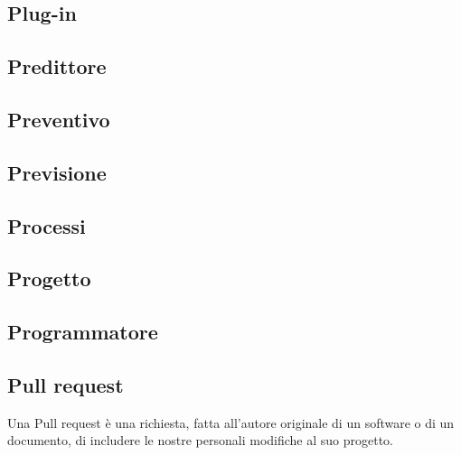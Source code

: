 
\subsection*{Plug-in}

\subsection*{Predittore}

\subsection*{Preventivo}

\subsection*{Previsione}

\subsection*{Processi}

\subsection*{Progetto}

\subsection*{Programmatore}

\subsection*{Pull request}
Una Pull request è una richiesta, fatta all’autore originale di un software o di un documento, di includere le nostre personali modifiche al suo progetto.


